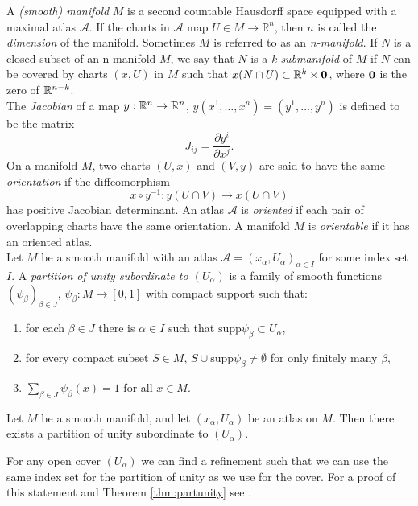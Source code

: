 A \textit{(smooth) manifold} $M$ is a second countable Hausdorff space equipped
with a maximal atlas $\mathcal{A}$. If the charts in $\mathcal{A}$ map $U\in
M\rightarrow \mathbb{R}^n$, then $n$ is called the \textit{dimension} of the
manifold. Sometimes $M$ is referred to as an \textit{n-manifold}. If $N$ is a
closed subset of an n-manifold $M$, we say that $N$ is a \textit{k-submanifold}
of $M$ if $N$ can be covered by charts $(x,U)$ in $M$ such that $x(N\cap
U)\subset {\mathbb R}^k\times {\bf 0}$, where ${\bf 0}$ is the zero of ${\mathbb R}^{n-k}$.\\ 

The \textit{Jacobian} of a map $y:{\mathbb R}^n\rightarrow {\mathbb R}^n$,
$y(x^1,\dots,x^n)=(y^1,\dots,y^n)$ is defined to be the matrix
\[ J_{ij}=\frac{\partial y^i}{\partial x^j}. \]
On a manifold $M$, two charts $(U,x)$ and $(V,y)$ are said to have the same
\textit{orientation} if the diffeomorphism 
\[ x\circ y^{-1} : y(U\cap V)\rightarrow x(U\cap V) \]
has positive Jacobian determinant. An atlas $\mathcal{A}$ is \textit{oriented}
if each pair of overlapping charts have the same orientation. A manifold $M$ is
\textit{orientable} if it has an oriented atlas.\\

Let $M$ be a smooth manifold with an atlas $\mathcal{A}={(x_\alpha,
U_\alpha)}_{\alpha\in I}$ for some index set $I$. A \textit{partition of unity
subordinate to $(U_\alpha)$} is a family of smooth functions
$(\psi_\beta)_{\beta\in J}$, $\psi_\beta : M\rightarrow [0,1]$ with compact
support such that:
\begin{enumerate}
\item for each $\beta \in J$ there is $\alpha \in I$ such that
$\mbox{supp}\psi_\beta \subset U_\alpha$, 
\item for every compact subset $S\in M$, $S\cup \mbox{supp}\psi_{\beta}\neq
\emptyset$ for only finitely many $\beta$, 
\item $\sum_{\beta \in J} \psi_{\beta}(x)=1$ for all $x\in M$.\\
\end{enumerate}

\begin{thm}\label{thm:partunity}
Let $M$ be a smooth manifold, and let $(x_\alpha,U_\alpha)$ be an atlas on $M$.
Then there exists a partition of unity subordinate to $(U_\alpha)$.
\end{thm}

 For any open cover $(U_\alpha)$ we can find a refinement such that we can use
the same index set for the partition of unity as we use for the cover. For a
proof of this statement and Theorem \ref{thm:partunity} see \cite{Sternberg}.\\

